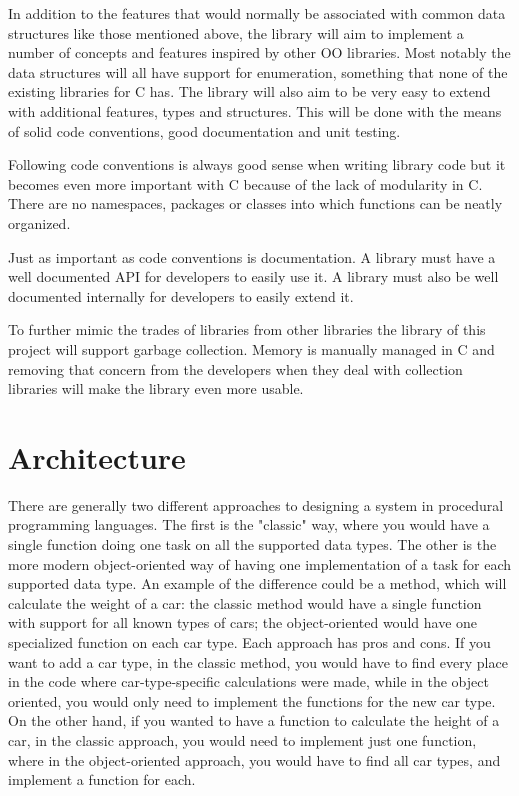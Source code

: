 \documentclass[table]{ituthesis}
\begin{document}
In addition to the features that would normally be associated with common data structures like those mentioned above, the library will aim to implement a number of concepts and features inspired by other OO libraries. Most notably the data structures will all have support for enumeration, something that none of the existing libraries for C has. The library will also aim to be very easy to extend with additional features, types and structures. This will be done with the means of solid code conventions, good documentation and unit testing.

Following code conventions is always good sense when writing library code but it becomes even more important with C because of the lack of modularity in C. There are no namespaces, packages or classes into which functions can be neatly organized.

Just as important as code conventions is documentation. A library must have a well documented API for developers to easily use it. A library must also be well documented internally for developers to easily extend it.

To further mimic the trades of libraries from other libraries the library of this project will support garbage collection. Memory is manually managed in C and removing that concern from the developers when they deal with collection libraries will make the library even more usable.

\chapter{Architecture}

There are generally two different approaches to designing a system in procedural programming languages. The first is the "classic" way, where you would have a single function doing one task on all the supported data types. The other is the more modern object-oriented way of having one implementation of a task for each supported data type. An example of the difference could be a method, which will calculate the weight of a car: the classic method would have a single function with support for all known types of cars; the object-oriented would have one specialized function on each car type. Each approach has pros and cons. If you want to add a car type, in the classic method, you would have to find every place in the code where car-type-specific calculations were made, while in the object oriented, you would only need to implement the functions for the new car type. On the other hand, if you wanted to have a function to calculate the height of a car, in the classic approach, you would need to implement just one function, where in the object-oriented approach, you would have to find all car types, and implement a function for each.
\end{document}
